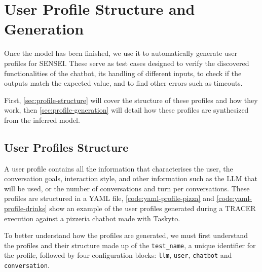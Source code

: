
\chapter{User Profile Structure and Generation}\label{chapter:user-profiles}

Once the model has been finished,
we use it to automatically generate user profiles for SENSEI.
These serve as test cases designed to verify
the discovered functionalities of the chatbot,
its handling of different inputs,
to check if the outputs match the expected value,
and to find other errors such as timeouts.

First, \autoref{sec:profile-structure}
will cover the structure of these profiles and how they work,
then \autoref{sec:profile-generation}
will detail how these profiles are synthesized from the inferred model.


\section{User Profiles Structure}\label{sec:profile-structure}

A user profile contains all the information
that characterises the user,
the conversation goals,
interaction style,
and other information such as the \ac{LLM} that will be used,
or the number of conversations and turn per conversations.
These profiles are structured in a YAML file,
\autoref{code:yaml-profile-pizza} and \autoref{code:yaml-profile-drinks}
show an example of the user profiles generated during a \ac{TRACER} execution
against a pizzeria chatbot made with Taskyto.







To better understand how the profiles are generated,
we must first understand the profiles and their structure
made up of the \texttt{test\_name},
a unique identifier for the profile,
followed by four configuration blocks:
\texttt{llm}, \texttt{user}, \texttt{chatbot} and \texttt{conversation}.

